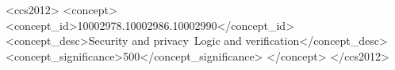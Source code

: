 \documentclass[sigconf, anonymous]{acmart}
\begin{document}
\begin{CCSXML}
<ccs2012>
  <concept>
      <concept_id>10002978.10002986.10002990</concept_id>
      <concept_desc>Security and privacy~Logic and verification</concept_desc>
      <concept_significance>500</concept_significance>
      </concept>
</ccs2012>
\end{CCSXML}
  




\maketitle
\end{document}
